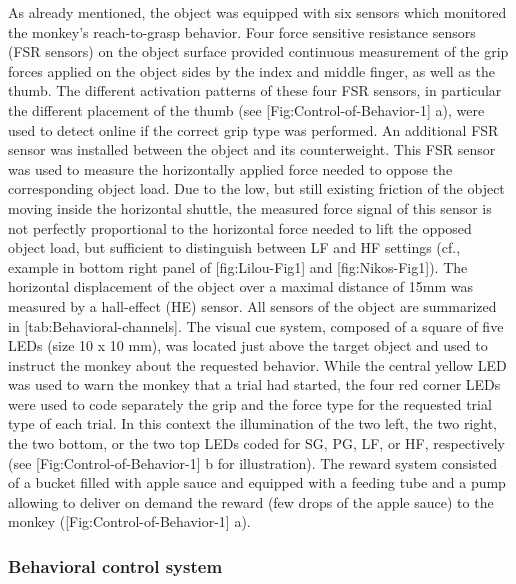 {As already mentioned, the object was equipped with six sensors which monitored the monkey's reach-to-grasp behavior. Four force sensitive resistance sensors (FSR sensors) on the object surface provided continuous measurement of the grip forces applied on the object sides by the index and middle finger, as well as the thumb. The different activation patterns of these four FSR sensors, in particular the different placement of the thumb (see [Fig:Control-of-Behavior-1] a), were used to detect online if the correct grip type was performed. An additional FSR sensor was installed between the object and its counterweight. This FSR sensor was used to measure the horizontally applied force needed to oppose the corresponding object load. Due to the low, but still existing friction of the object moving inside the horizontal shuttle, the measured force signal of this sensor is not perfectly proportional to the horizontal force needed to lift the opposed object load, but sufficient to distinguish between LF and HF settings (cf., example in bottom right panel of [fig:Lilou-Fig1] and [fig:Nikos-Fig1]). The horizontal displacement of the object over a maximal distance of 15mm was measured by a hall-effect (HE) sensor. All sensors of the object are summarized in [tab:Behavioral-channels]. The visual cue system, composed of a square of five LEDs (size 10 x 10 mm), was located just above the target object and used to instruct the monkey about the requested behavior. While the central yellow LED was used to warn the monkey that a trial had started, the four red corner LEDs were used to code separately the grip and the force type for the requested trial type of each trial. In this context the illumination of the two left, the two right, the two bottom, or the two top LEDs coded for SG, PG, LF, or HF, respectively (see [Fig:Control-of-Behavior-1] b for illustration). The reward system consisted of a bucket filled with apple sauce and equipped with a feeding tube and a pump allowing to deliver on demand the reward (few drops of the apple sauce) to the monkey ([Fig:Control-of-Behavior-1] a).

\subsubsection{Behavioral control system}

}

